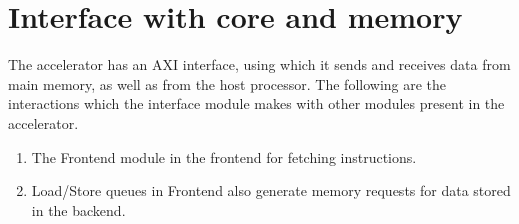 \section{Interface with core and memory}
The accelerator has an AXI interface, using which it sends and receives data from main memory, as well as from the host processor. The following are the interactions which the interface module makes with other modules present in the accelerator.

\begin{enumerate}
    \item The Frontend module in the frontend for fetching instructions.
    \item Load/Store queues in Frontend also generate memory requests for data stored in the backend.
\end{enumerate}

